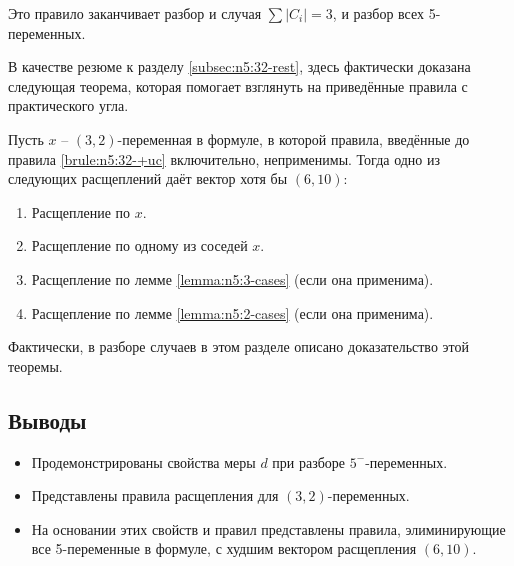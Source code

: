 Это правило заканчивает разбор и случая $\sum |C_i| = 3$, и разбор всех 5-переменных.

В качестве резюме к разделу \ref{subsec:n5:32-rest}, здесь фактически доказана следующая теорема, которая помогает взглянуть на приведённые правила с практического угла.

\begin{theorem}
 Пусть $x$ -- $(3,2)$-переменная в формуле, в которой правила, введённые до правила \ref{brule:n5:32-+uc} включительно, неприменимы. Тогда одно из следующих расщеплений даёт вектор хотя бы $(6,10)$:

 \begin{enumerate}
  \item Расщепление по $x$.
  \item Расщепление по одному из соседей $x$.
  \item Расщепление по лемме \ref{lemma:n5:3-cases} (если она применима).
  \item Расщепление по лемме \ref{lemma:n5:2-cases} (если она применима).
 \end{enumerate}

 \label{theorem:n5:32-rest}
\end{theorem}

Фактически, в разборе случаев в этом разделе описано доказательство этой теоремы.

\subsection{Выводы}
\label{subsec:n5:summary}

\begin{itemize}
 \item Продемонстрированы свойства меры $d$ при разборе $5^-$-переменных.
 \item Представлены правила расщепления для $(3,2)$-переменных.
 \item На основании этих свойств и правил представлены правила, элиминирующие все 5-переменные в формуле, с худшим вектором расщепления $(6,10)$.
\end{itemize}

